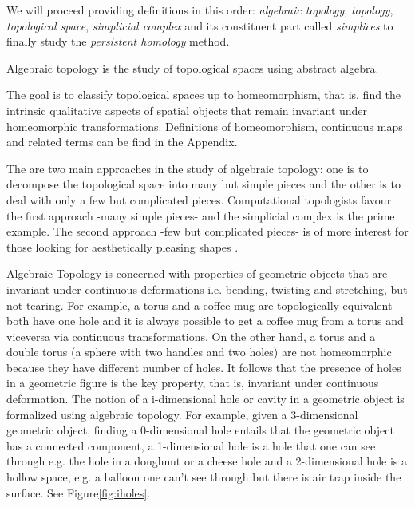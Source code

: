 \documentclass[onecollarge,runningheads]{svjour2}
\begin{document}
We will proceed providing definitions in this order: \emph{algebraic topology}, \emph{topology}, \emph{topological space}, \emph{simplicial complex} and its constituent part called \emph{simplices} to finally study the \emph{persistent homology} method.

\begin{definition} 
Algebraic topology is the study of topological spaces using abstract algebra. 
\end{definition}
The goal is to classify topological spaces up to homeomorphism, that is, find the intrinsic qualitative aspects of spatial objects that remain invariant under homeomorphic transformations. Definitions of homeomorphism, continuous maps and related terms can be find in the Appendix.

The are two main approaches in the study of algebraic topology: one is to decompose the topological space into many but simple pieces and the other is to deal with only a few but complicated pieces. Computational topologists favour the first approach -many simple pieces- and the simplicial complex is the prime example. The second approach -few but complicated pieces- is of more interest for those looking for aesthetically pleasing shapes \cite{edelsbrunner2010computational}. %

Algebraic Topology is concerned with properties of geometric objects that are invariant under continuous deformations i.e. bending, twisting and stretching, but not tearing. 
For example, a torus and a coffee mug are topologically equivalent both have one hole and it is always possible to get a coffee mug from a torus and viceversa via continuous transformations. On the other hand, a torus and a double torus (a sphere with two handles and two holes) are not homeomorphic because they have different number of holes. 
It follows that the presence of holes in a geometric figure is the key property, that is, invariant under continuous deformation. The notion of a i-dimensional hole or cavity in a geometric object is formalized using algebraic topology. For example, given a 3-dimensional geometric object, finding a 0-dimensional hole entails that the geometric object has a connected component, a 1-dimensional hole is a hole that one can see through e.g. the hole in a doughnut or a cheese hole and a 2-dimensional hole is a hollow space, e.g. a balloon one can't see through but there is air trap inside the surface. See Figure\ref{fig:iholes}.
\end{document}
